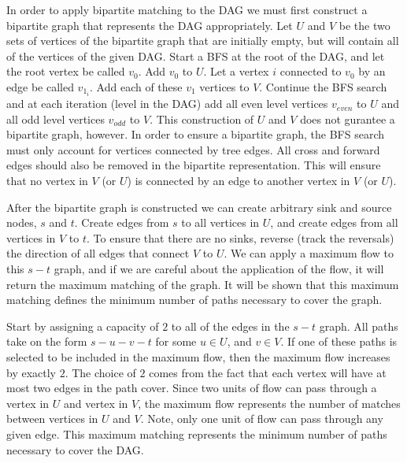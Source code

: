 \documentclass[11pt]{article}
\begin{document}
In order to apply bipartite matching to the DAG we must first construct a 
bipartite graph that represents the DAG appropriately. Let $U$ and $V$ 
be the two sets of vertices of the bipartite graph that are initially empty, but will contain
all of the vertices of the given DAG. Start a BFS at the root of the DAG, 
and let the root vertex be called $v_0$. Add $v_0$ to $U$. Let a vertex $i$
connected to $v_0$ by an edge be called $v_{1_i}$. Add each of these $v_1$ vertices 
to $V$. Continue the BFS search and at each iteration (level in the DAG)
add all even level vertices $v_{even}$ to $U$ and all odd level vertices $v_{odd}$ to $V$.
This construction of $U$ and $V$ does not gurantee a bipartite graph, however. 
In order to ensure a bipartite graph, the BFS search must
only account for vertices connected by tree edges. All cross and forward 
edges should also be removed in the bipartite representation. 
This will ensure that no 
vertex in $V$ (or $U$) is connected by an edge to another vertex in $V$ (or $U$).

After the bipartite graph is constructed we can create arbitrary sink and source 
nodes, $s$ and $t$. Create edges from $s$ to all vertices in $U$, and create 
edges from all vertices in $V$ to $t$. 
To ensure that there are no sinks, reverse (track the reversals) the direction of all edges
that connect $V$ to $U$.
We can apply a maximum flow to this $s - t$ graph, 
and if we are careful about the application of the flow, it will return the
maximum matching of the graph. It will be shown that this maximum matching defines the 
minimum number of paths necessary to cover the graph. 

Start by assigning a capacity of $2$ to all of the edges 
in the $s -t$ graph. All paths take on the form $s-u-v-t$ for some $u\in U$, and $v\in V$.
If one of these paths is selected to be included in the maximum flow, 
then the maximum flow increases by exactly $2$. The choice of $2$ comes from the 
fact that each vertex will have at most two edges in the path cover.  Since two units of flow 
can pass through a vertex in $U$ and vertex in $V$, the maximum flow represents the
number of matches between vertices in $U$ and $V$. Note, only one unit of flow can 
pass through any given edge. This maximum matching represents the minimum number of 
paths necessary to cover the DAG.

\label{pg:end-of-p5}


%
\end{document}
